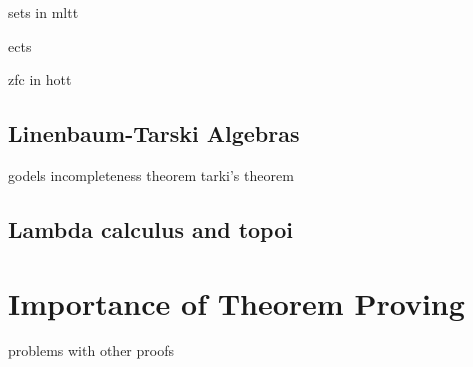 sets in mltt

ects

zfc in hott

\subsection{Linenbaum-Tarski Algebras}
godels incompleteness theorem
tarki's theorem
\subsection{Lambda calculus and topoi}
\section{Importance of Theorem Proving}
problems with other proofs
